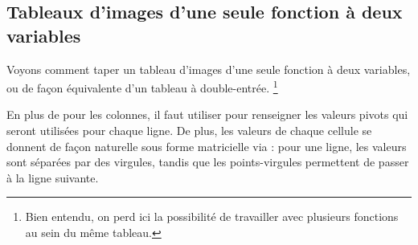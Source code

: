 \documentclass[10pt, a4paper]{article}
\begin{document}

\subsection{Tableaux d'images d'une seule fonction à deux variables}

Voyons comment taper un tableau d'images d'une seule fonction à deux variables, ou de façon équivalente d'un tableau à double-entrée.
\footnote{
	Bien entendu, on perd ici la possibilité de travailler avec plusieurs fonctions au sein du même tableau.
}




\begin{tdocexa}
    En plus de  pour les colonnes, il faut utiliser  pour renseigner les valeurs pivots qui seront utilisées pour chaque ligne.
    De plus, les valeurs de chaque cellule se donnent de façon naturelle sous forme matricielle via  : pour une ligne, les valeurs sont séparées par des virgules, tandis que les points-virgules permettent de passer à la ligne suivante.

\end{tdocexa}




\begin{tdocexa}
    \leavevmode

\end{tdocexa}
\end{document}
